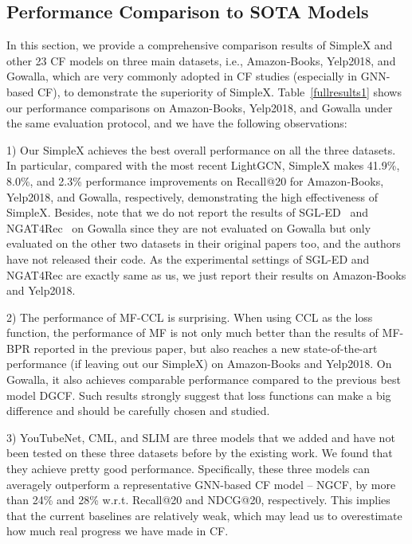 \documentclass[sigconf,authorversion]{acmart}
\begin{document}
\subsection{Performance Comparison to SOTA Models}
\label{performance_comparison_to_sota}
In this section, we provide a comprehensive comparison results of SimpleX and other 23 CF models on three main datasets, i.e., Amazon-Books, Yelp2018, and Gowalla, which are very commonly adopted in CF studies (especially in GNN-based CF), to demonstrate the superiority of SimpleX. 
Table~\ref{fullresults1} shows our performance comparisons on Amazon-Books, Yelp2018, and Gowalla under the same evaluation protocol, and we have the following observations:




1) Our SimpleX achieves the best overall performance on all the three datasets. In particular, compared with the most recent LightGCN, SimpleX makes 41.9\%, 8.0\%, and 2.3\% performance improvements on Recall@20 for Amazon-Books, Yelp2018, and Gowalla, respectively, demonstrating the high effectiveness of SimpleX. Besides, note that we do not report the results of SGL-ED~\cite{SGL-ED} and NGAT4Rec~\cite{NGAT4Rec} on Gowalla since they are not evaluated on Gowalla but only evaluated on the other two datasets in their original papers too, and the authors have not released their code. As the experimental settings of SGL-ED and NGAT4Rec are exactly same as us, we just report their results on Amazon-Books and Yelp2018. 
    
2) The performance of MF-CCL is surprising. When using CCL as the loss function, the performance of MF is not only much better than the results of MF-BPR reported in the previous paper, but also reaches a new state-of-the-art performance (if leaving out our SimpleX) on Amazon-Books and Yelp2018. On Gowalla, it also achieves comparable performance compared to the previous best model DGCF. Such results strongly suggest that loss functions can make a big difference and should be carefully chosen and studied.
    
3) YouTubeNet, CML, and SLIM are three models that we added and have not been tested on these three datasets before by the existing work. We found that they achieve pretty good performance. Specifically, these three models can averagely outperform a representative GNN-based CF model -- NGCF, by more than 24\% and 28\% w.r.t. Recall@20 and NDCG@20, respectively. This implies that the current baselines are relatively weak, which may lead us to overestimate how much real progress we have made in CF.
    
\end{document}
